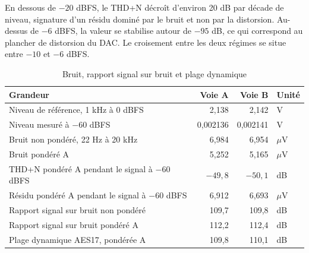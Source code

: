 
En dessous de $-20$ dBFS, le THD+N décroît d'environ 20 dB par décade de niveau, signature d'un résidu dominé par le bruit et non par la distorsion. Au-dessus de $-6$ dBFS, la valeur se stabilise autour de $-95$ dB, ce qui correspond au plancher de distorsion du \gls{DAC}. Le croisement entre les deux régimes se situe entre $-10$ et $-6$ dBFS.

\begin{table}[H]
  \centering
  \caption{Bruit, rapport signal sur bruit et plage dynamique}
  \label{tab:ann_ap_bruit}
  \small
  \setlength{\tabcolsep}{6pt}
  \begin{tabular}{@{}>{\raggedright\arraybackslash}p{} r r l@{}}
    \toprule
    \textbf{Grandeur}                               & \textbf{Voie A} & \textbf{Voie B} & \textbf{Unité} \\
    \midrule
    Niveau de référence, 1 kHz à 0 dBFS             & 2,138           & 2,142           & V              \\
    Niveau mesuré à $-60$ dBFS                      & 0,002136        & 0,002141        & V              \\
    Bruit non pondéré, 22 Hz à 20 kHz               & 6,984           & 6,954           & $\mu$V         \\
    Bruit pondéré A                                 & 5,252           & 5,165           & $\mu$V         \\
    THD+N pondéré A pendant le signal à $-60$ dBFS  & $-49,8$         & $-50,1$         & dB             \\
    Résidu pondéré A pendant le signal à $-60$ dBFS & 6,912           & 6,693           & $\mu$V         \\
    Rapport signal sur bruit non pondéré            & 109,7           & 109,8           & dB             \\
    Rapport signal sur bruit pondéré A              & 112,2           & 112,4           & dB             \\
    Plage dynamique AES17, pondérée A               & 109,8           & 110,1           & dB             \\
    \bottomrule
  \end{tabular}
\end{table}

